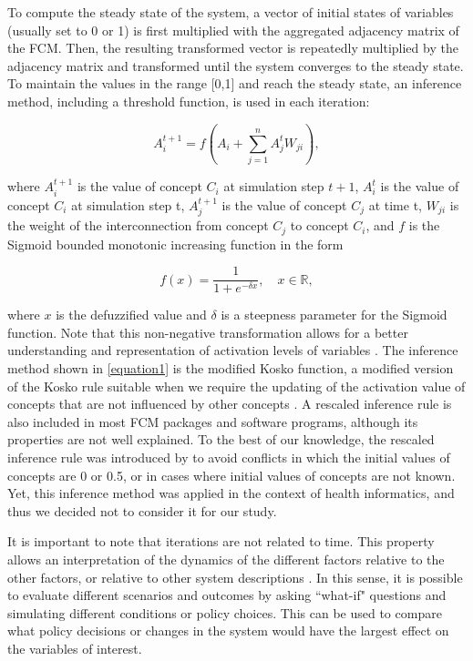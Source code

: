 To compute the steady state of the system, a vector of initial states of variables (usually set to 0 or 1) is first multiplied with the aggregated adjacency matrix of the FCM. Then, the resulting transformed vector is repeatedly multiplied by the adjacency matrix and  transformed until the system converges to the steady state. To maintain the values in the range [0,1] and reach the steady state, an inference method, including a threshold function, is used in each iteration:

\begin{equation}
\label{equation1} 
A_i^{t+1} = f \left( A_i + \sum_{j=1}^{n} A_j^t W_{ji} \right), 
\end{equation}

where $A_i^{t+1}$ is the value of concept $C_i$ at simulation
step  $t+1$, $A_i^{t}$ is the value of concept $C_i$ at simulation
step t, $A_j^{t+1}$ is the value of concept $C_j$ at time t, $W_{ji}$ is
the weight of the interconnection from concept $C_j$ to
concept $C_i$, and $f$ is the Sigmoid bounded monotonic increasing function in the form

\begin{equation}
\label{equation2}  
f(x) = \frac{1}{1+e^{-\delta x}}, \quad  x \in \mathbb{R}, 
\end{equation}

where $x$ is the defuzzified value and $\delta$ is a steepness parameter for the Sigmoid function. Note that this non-negative transformation allows for a better understanding and representation of activation levels of variables \citep{ozesmi2004ecological}. The inference method shown in \cref{equation1} is the modified Kosko function, a modified version of the Kosko rule suitable when we require the updating of the activation value of concepts that are not influenced by other concepts \citep{sujamol2018study}. A rescaled inference rule is also included in most FCM packages and software programs, although its properties are not well explained. To the best of our knowledge, the rescaled inference rule was introduced by \cite{papageorgiou2011new} to avoid conflicts in which the initial values of concepts are 0 or 0.5, or in cases where initial values of concepts are not known. Yet, this inference method was applied in the context of health informatics, and thus we decided not to consider it for our study. 



It is important to note that iterations are not related to time. This property allows an interpretation of the dynamics of the different factors relative to the other factors, or relative to other system descriptions \citep{edwards2021building, diniz2015mapping}. In this sense, it is possible to evaluate different scenarios and outcomes by asking ``what-if" questions and simulating different conditions or policy choices. This can be used to compare what policy decisions or changes in the system would have the largest effect on the variables of interest.

